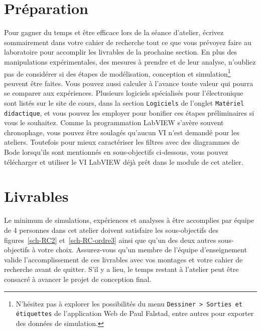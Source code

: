 \documentclass[canadien,12pt,oneside,letterpaper]{article}
\begin{document}
\section{Préparation}\label{sec:prep}
\vspace{-3ex}
Pour gagner du temps et être efficace lors de la séance d'atelier, écrivez sommairement dans votre cahier de recherche tout ce que vous prévoyez faire au laboratoire pour accomplir les livrables de la prochaine section. En plus des manipulations expérimentales, des mesures à prendre et de leur analyse, n'oubliez pas de considérer si des étapes de modélisation, conception et simulation\footnote{N'hésitez pas à explorer les possibilités du menu \texttt{Dessiner~>~Sorties et étiquettes} de l'application Web de Paul Falstad, entre autres pour exporter des données de simulation.} peuvent être faites. Vous pouvez aussi calculer à l'avance toute valeur qui pourra se comparer aux expériences. Plusieurs logiciels spécialisés pour l'électronique sont listés sur le site de cours, dans la section \texttt{Logiciels} de l'onglet \texttt{Matériel didactique}, et vous pouvez les employer pour bonifier ces étapes préliminaires si vous le souhaitez. Comme la programmation LabVIEW s'avère souvent chronophage, vous pouvez être soulagés qu'aucun VI n'est demandé pour les ateliers. Toutefois pour mieux caractériser les filtres avec des diagrammes de Bode lorsqu'ils sont mentionnés en sous-objectifs ci-dessous, vous pouvez télécharger et utiliser le VI LabVIEW déjà prêt dans le module de cet atelier.

\vspace{-2ex}
\section{Livrables}\label{sec:prep}
\vspace{-3ex}
Le minimum de simulations, expériences et analyses à être accomplies par équipe de 4 personnes dans cet atelier doivent satisfaire les sous-objectifs des figures~\ref{sch-RC2} et~\ref{sch-RC-ordre3} ainsi que qu'un des deux autres sous-objectifs à votre choix. Assurez-vous qu'un membre de l'équipe d'enseignement valide l'accomplissement de ces livrables avec vos montages et votre cahier de recherche avant de quitter. S'il y a lieu, le temps restant à l'atelier peut être consacré à avancer le projet de conception final.
\end{document}
